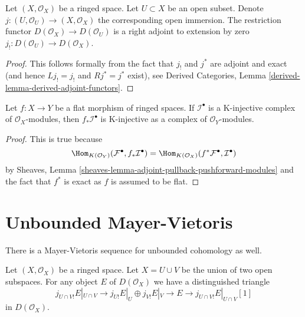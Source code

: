 \begin{lemma}
\label{lemma-adjoint-lower-shriek-restrict}
Let $(X, \mathcal{O}_X)$ be a ringed space. Let $U \subset X$ be an
open subset. Denote $j : (U, \mathcal{O}_U) \to (X, \mathcal{O}_X)$
the corresponding open immersion. The restriction functor
$D(\mathcal{O}_X) \to D(\mathcal{O}_U)$ is a right adjoint to
extension by zero $j_! : D(\mathcal{O}_U) \to D(\mathcal{O}_X)$.
\end{lemma}

\begin{proof}
This follows formally from the fact that $j_!$ and $j^*$ are adjoint and
exact (and hence $Lj_! = j_!$ and $Rj^* = j^*$ exist), see
Derived Categories, Lemma \ref{derived-lemma-derived-adjoint-functors}.
\end{proof}

\begin{lemma}
\label{lemma-K-injective-flat}
Let $f : X \to Y$ be a flat morphism of ringed spaces.
If $\mathcal{I}^\bullet$ is a K-injective complex of $\mathcal{O}_X$-modules,
then $f_*\mathcal{I}^\bullet$ is K-injective as a complex of
$\mathcal{O}_Y$-modules.
\end{lemma}

\begin{proof}
This is true because
$$
\Hom_{K(\mathcal{O}_Y)}(\mathcal{F}^\bullet, f_*\mathcal{I}^\bullet)
=
\Hom_{K(\mathcal{O}_X)}(f^*\mathcal{F}^\bullet, \mathcal{I}^\bullet)
$$
by
Sheaves, Lemma
\ref{sheaves-lemma-adjoint-pullback-pushforward-modules}
and the fact that $f^*$ is exact as $f$ is assumed to be flat.
\end{proof}





\section{Unbounded Mayer-Vietoris}
\label{section-unbounded-mayer-vietoris}

\noindent
There is a Mayer-Vietoris sequence for unbounded cohomology as well.

\begin{lemma}
\label{lemma-exact-sequence-lower-shriek}
Let $(X, \mathcal{O}_X)$ be a ringed space.
Let $X = U \cup V$ be the union of two open subspaces.
For any object $E$ of $D(\mathcal{O}_X)$ we have a distinguished
triangle
$$
j_{U \cap V!}E|_{U \cap V} \to
j_{U!}E|_U \oplus j_{V!}E|_V \to E \to 
j_{U \cap V!}E|_{U \cap V}[1]
$$
in $D(\mathcal{O}_X)$.
\end{lemma}

